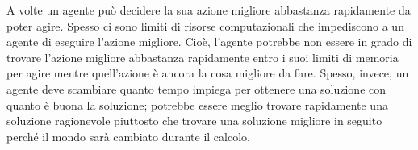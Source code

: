 \documentclass[a4paper]{extarticle}
\begin{document}
A volte un agente può decidere la sua azione migliore abbastanza rapidamente da poter agire. Spesso ci sono limiti di risorse computazionali che impediscono a un agente di eseguire l'azione migliore. Cioè, l'agente potrebbe non essere in grado di trovare l'azione migliore abbastanza rapidamente entro i suoi limiti di memoria per agire mentre quell'azione è ancora la cosa migliore da fare. Spesso, invece, un agente deve scambiare quanto tempo impiega per ottenere una soluzione con quanto è buona la soluzione; potrebbe essere meglio trovare rapidamente una soluzione ragionevole piuttosto che trovare una soluzione migliore in seguito perché il mondo sarà cambiato durante il calcolo.
\end{document}
